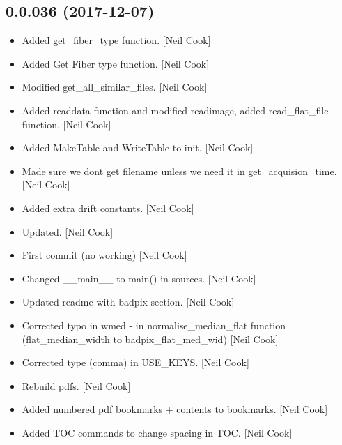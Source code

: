 \documentclass[a4paper,10pt,english]{report}
\begin{document}
\subsection{0.0.036 (2017-12-07)}
\label{\detokenize{misc/changelog:id514}}\begin{itemize}
\item {} 
Added get\_fiber\_type function. {[}Neil Cook{]}

\item {} 
Added Get Fiber type function. {[}Neil Cook{]}

\item {} 
Modified get\_all\_similar\_files. {[}Neil Cook{]}

\item {} 
Added readdata function and modified readimage, added read\_flat\_file
function. {[}Neil Cook{]}

\item {} 
Added MakeTable and WriteTable to init. {[}Neil Cook{]}

\item {} 
Made sure we dont get filename unless we need it in
get\_acquision\_time. {[}Neil Cook{]}

\item {} 
Added extra drift constants. {[}Neil Cook{]}

\item {} 
Updated. {[}Neil Cook{]}

\item {} 
First commit (no working) {[}Neil Cook{]}

\item {} 
Changed \_\_main\_\_ to main() in sources. {[}Neil Cook{]}

\item {} 
Updated readme with badpix section. {[}Neil Cook{]}

\item {} 
Corrected typo in wmed - in normalise\_median\_flat function
(flat\_median\_width to badpix\_flat\_med\_wid) {[}Neil Cook{]}

\item {} 
Corrected type (comma) in USE\_KEYS. {[}Neil Cook{]}

\item {} 
Rebuild pdfs. {[}Neil Cook{]}

\item {} 
Added numbered pdf bookmarks + contents to bookmarks. {[}Neil Cook{]}

\item {} 
Added TOC commands to change spacing in TOC. {[}Neil Cook{]}


\end{itemize}
\end{document}

